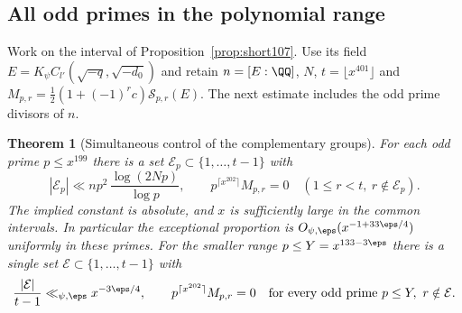 \documentclass[a4paper,11pt]{article}
\newtheorem{theorem}[proposition]{Theorem}
\theoremstyle{definition}
\theoremstyle{remark}
\numberwithin{equation}{section}
\begin{document}
\subsection{All odd primes in the polynomial range}\label{nav:II-33}
Work on the interval of Proposition~\ref{prop:short107}.
Use its field \(E=K_\psi C_{l'}(\sqrt{-q},\sqrt{-d_0})\) and
retain \(n=[E:\QQ]\), \(N\), \(t=\lfloor x^{401}\rfloor\) and
\(M_{p,r}=\tfrac12(1+(-1)^rc)\mathcal S_{p,r}(E)\).
The next estimate includes the odd prime divisors of \(n\).

\begin{theorem}[Simultaneous control of the complementary groups]
\label{thm:every144}
For each odd prime \(p\le x^{199}\) there is a set
\(\mathcal E_p\subset\{1,\ldots,t-1\}\) with
\[
    |\mathcal E_p|\ll n p^2\,\frac{\log(2Np)}{\log p},
   \qquad p^{\lceil x^{202}\rceil} M_{p,r}=0
                           \quad (1\le r<t,\ r\notin\mathcal E_p).
\]
The implied constant is absolute, and \(x\) is sufficiently
large in the common intervals. In particular the exceptional
proportion is \(O_{\psi,\eps}(x^{-1+33\eps/4})\) uniformly in
these primes. For the smaller range
\(p\le Y=x^{133-3\eps}\) there is a single set
\(\mathcal E\subset\{1,\ldots,t-1\}\) with
\begin{equation}
  \frac{|\mathcal E|}{t-1}\ll_{\psi,\eps}x^{-3\eps/4},
  \qquad
  p^{\lceil x^{202}\rceil}M_{p,r}=0
   \quad\text{for every odd prime }p\le Y,\ r\notin\mathcal E .
  \label{eq:joint144}
\end{equation}
\end{theorem}
\end{document}
